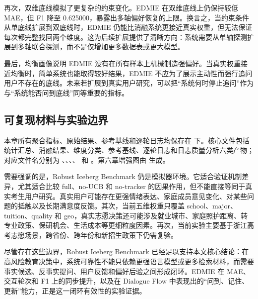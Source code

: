 再次，双维底线模拟了更复杂的约束变化。EDMIE 在双维底线上仍保持较低 MAE，但 F1 降至 0.625000，暴露出多轴偏好恢复的上限。换言之，当约束条件从单底线扩展到双底线时，EDMIE 仍能比消融系统更接近真实权重，但无法保证每次都完整找回两个维度。这为后续扩展提供了清晰方向：系统需要从单轴探测扩展到多轴联合探测，而不是仅增加更多数据表或更大模型。

最后，均衡画像说明 EDMIE 没有在所有样本上机械制造强偏好。当真实权重接近均衡时，简单系统也能取得较好结果，EDMIE 不应为了展示主动性而强行追问用户不存在的底线。未来若扩展到真实用户研究，可以把“系统何时停止追问”作为与“系统能否问到底线”同等重要的指标。

\subsection{可复现材料与实验边界}

本章所有聚合指标、原始结果、参考基线和逐轮日志均保存在  下。核心文件包括统计汇总、消融结果、维度分类、参考基线、逐轮日志和日志质量分析六类产物；对应文件名分别为 、、、、 和 。第六章增强图由  生成。

需要强调的是，Robust Iceberg Benchmark 仍是模拟器环境。它适合验证机制差异，尤其适合比较 full、no-UCB 和 no-tracker 的因果作用，但不能直接等同于真实考生用户研究。真实用户可能存在更强情绪表达、家庭成员意见变化、对某些问题的抵触以及长期满意度反馈。其次，当前五维权重只覆盖 school、major、tuition、quality 和 geo，真实志愿决策还可能涉及就业城市、家庭照护距离、转专业政策、保研机会、生活成本等更细粒度因素。再次，当前实验主要基于浙江高考志愿场景，跨省份、跨年份和新招生政策下仍需复验。

尽管存在这些边界，Robust Iceberg Benchmark 已经足以支持本文核心结论：在高风险教育决策中，系统可靠性不能只依赖更强语言模型或更多检索材料，而需要事实候选、反事实提问、用户反馈和偏好后验之间形成闭环。EDMIE 在 MAE、交互轮次和 F1 上的同步提升，以及在 Dialogue Flow 中表现出的“问到、记住、更新”能力，正是这一闭环有效性的实验证据。
